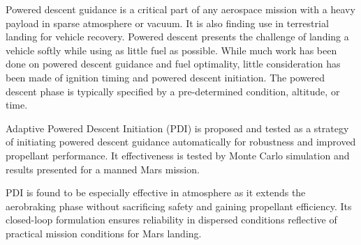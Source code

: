 


%

Powered descent guidance is a critical part of any aerospace mission with a heavy payload in sparse atmosphere or vacuum. It is also finding use in terrestrial landing for vehicle recovery. Powered descent presents the challenge of landing a vehicle softly while using as little fuel as possible. While much work has been done on powered descent guidance and fuel optimality, little consideration has been made of ignition timing and powered descent initiation. The powered descent phase is typically specified by a pre-determined condition, altitude, or time.

Adaptive Powered Descent Initiation (PDI) is proposed and tested as a strategy of initiating powered descent guidance automatically for robustness and improved propellant performance. It effectiveness is tested by Monte Carlo simulation and results presented for a manned Mars mission.

PDI is found to be especially effective in atmosphere as it extends the aerobraking phase without sacrificing safety and gaining propellant efficiency. Its closed-loop formulation ensures reliability in dispersed conditions reflective of practical mission conditions for Mars landing.
